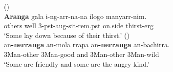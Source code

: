 \documentclass{article}
\begin{document}
\begin{exe}
   (\citealt[268]{bowern12})\\
  \gll \textbf{Aranga} gala i-ng-arr-na-na ilogo manyarr-nim.\\
  others well 3-{\sc pst-aug}-sit-{\sc rem.pst} on.side thirst-{\sc erg}\\
  \glt `Some lay down because of their thirst.'
   (\citealt[84]{green87})\\
  \gll an\textbf{-nerranga}    an-mola    rrapa    an\textbf{-nerranga}    an-bachirra.\\
  3Man-other    3Man-good    and    3Man-other    3Man-wild\\
  \glt `Some are friendly and some are the angry kind.'


\end{exe}

\end{document}
